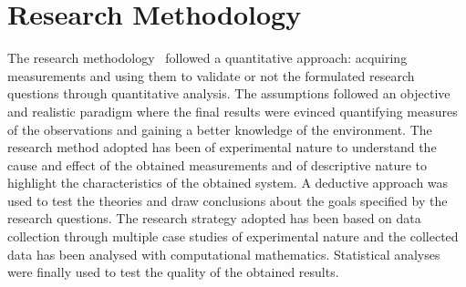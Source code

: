 
\section{Research Methodology}

\noindent
The research methodology~\cite{RESEARCHMETHOD} followed a quantitative approach: acquiring measurements and using them to validate or not the formulated research questions through quantitative analysis.
The assumptions followed an objective and realistic paradigm where the final results were evinced quantifying measures of the observations and gaining a better knowledge of the environment.
The research method adopted has been of experimental nature to understand the cause and effect of the obtained measurements and of descriptive nature to highlight the characteristics of the obtained system.
A deductive approach was used to test the theories and draw conclusions about the goals specified by the research questions.
The research strategy adopted has been based on data collection through multiple case studies of experimental nature and the collected data has been analysed with computational mathematics.
Statistical analyses were finally used to test the quality of the obtained results.

